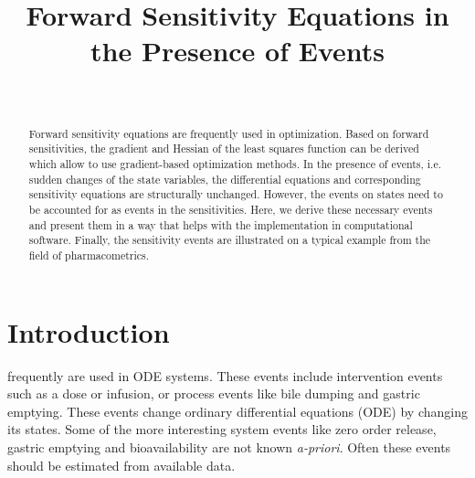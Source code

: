 \documentclass[journal, a4paper]{IEEEtran}
\begin{document}
	\title{Forward Sensitivity Equations in the Presence of Events}

\author{
    \\
}


	\maketitle

\begin{abstract}

  Forward sensitivity equations are frequently used in
  optimization. Based on forward sensitivities, the gradient and
  Hessian of the least squares function can be derived which allow to
  use gradient-based optimization methods. In the presence of events,
  i.e. sudden changes of the state variables, the differential
  equations and corresponding sensitivity equations are structurally
  unchanged. However, the events on states need to be accounted for as
  events in the sensitivities. Here, we derive these necessary events
  and present them in a way that helps with the implementation in
  computational software. Finally, the sensitivity events are
  illustrated on a typical example from the field of pharmacometrics.
\end{abstract}

\section{Introduction}
	 frequently are used in ODE systems.  These
	events include intervention events such as a dose
	or infusion, or process events like bile
	dumping and gastric emptying.  These events change ordinary
	differential equations (ODE) by changing its states.  Some of
	the more interesting system events like zero order release, gastric
	emptying and bioavailability are not known \emph{a-priori}.  Often these
	events should be estimated from available data.
\end{document}
